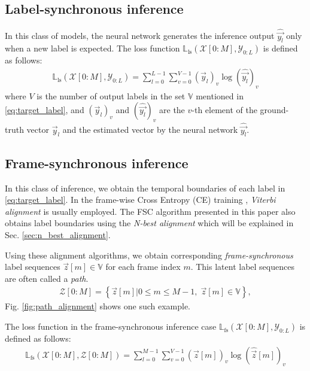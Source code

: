 \documentclass{article}
\begin{document}
\subsection{Label-synchronous inference}
In this class of models, the neural network generates the inference output 
$\widehat{\vec{y_l}}$ 
only when a new label is expected. The loss function 
$\mathbb{L}_{\text{ls}}\left(\mathcal{X}[0:M], \mathcal{Y}_{0:L}\right)$ is 
defined as follows:
   \begin{align}
     \mathbb{L}_{\text{ls}}\left(\mathcal{X}[0:M], 
        \mathcal{Y}_{0:L}\right) 
        = \sum_{l=0}^{L-1} 
          \sum_{v=0}^{V-1}
          \left(\vec{y}_l\right)_v  \log ( 
             \widehat{\vec{y_l}} )_{v}
          \label{eq:label_synchronous_ce_loss} 
   \end{align}
where $V$ is the number of output labels in the set $\mathbb{V}$ 
mentioned in \eqref{eq:target_label}, and ${(\vec{y}_l)}_v$  
and ${(\widehat{\vec{y_l}})}_{v}$ are the $v$-th element of the 
ground-truth vector $\vec{y}_l$ and the estimated vector by the 
neural network ${\widehat{\vec{y_l}}}$.


\subsection{Frame-synchronous inference}
\label{sec:frame_synchronous_inference}
In this class of inference,  we obtain
the temporal boundaries of each label in \eqref{eq:target_label}.
In the frame-wise Cross Entropy (CE) training 
\cite{g_hinton_ieee_signal_processing_mag_2012_00, 
C_Kim_INTERSPEECH_2017_1, 
B_Li_INTERSPEECH_2017_1}, {\it Viterbi alignment}  
\cite{
x_huang_prentice_hall_2001_00,
l_r_rabiner_proceedings_of_ieee_1989_00} is usually employed. 
The FSC algorithm presented in this paper also obtains
label boundaries using the {\it N-best alignment} which will
be explained in Sec. \ref{sec:n_best_alignment}.

Using these alignment algorithms, 
we obtain corresponding {\it frame-synchronous} label sequences 
$\vec{z}[m] \in \mathbb{V}$ for each frame index $m$. This
latent label sequences are often called a {\it path}.
  \begin{align}
    \mathcal{Z}[0:M]  =  
      \left\{\vec{z}[m]  \Big| 0 \le m \le M-1, \; \vec{z}[m] \in \mathbb{V} \right\}, 
    \label{eq:latent_label_seq}
  \end{align}
Fig. \ref{fig:path_alignment} shows one such example. 

The loss function in the frame-synchronous inference case
$\mathbb{L}_{\text{fs}}\left(\mathcal{X}[0:M], \mathcal{Y}_{0:L}\right)$ is 
defined as follows:
\begin{align}
  \mathbb{L}_{\text{fs}}\left(\mathcal{X}[0:M], \mathcal{Z}[0:M]\right) 
      = \sum_{l=0}^{M-1} 
          \sum_{v=0}^{V-1}  
            (\vec{z}[m])_v  
            \log (\widehat{\vec{z}}[m])_v  
        \label{eq:frame_synchronous_ce_loss} 
\end{align}
\end{document}
